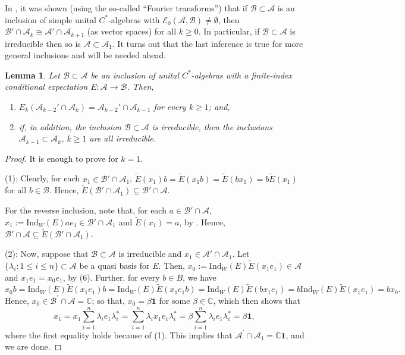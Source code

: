 \documentclass{amsart}
\numberwithin{equation}{section}
\newcommand{\Ind}{\mathrm{Ind}}
\newcommand{\mbb}{\mathbb}
\newcommand{\C}{\mathbb C}
\newcommand{\1}{\mathbf{1}}
\newcommand{\mA}{\mathcal{A}}
\newcommand{\mB}{\mathcal{B}}
\newcommand{\mE}{\mathcal{E}}
\newtheorem{lemma}[theorem]{Lemma}
\begin{document}
In \cite[Proposition 3.2]{BG}, it was shown (using the so-called
``Fourier transforms'') that if $\mB \subset \mA$ is an inclusion of
simple unital $C^*$-algebras with $\mE_0(\mA, \mB) \neq \emptyset$,
then $\mB'\cap \mA_{k} \cong \mA'\cap \mA_{k+1}$ (as vector spaces)
for all $k \geq 0$. In particular, if $\mB \subset \mA$ is irreducible
then so is $\mA \subset \mA_1$. It turns out that the last inference
is true for more general inclusions and will be needed ahead.

\begin{lemma}\label{irreducible-tower}
Let $\mB \subset \mA$ be an  inclusion of unital
$C^*$-algebras with a finite-index conditional expectation $E: \mA \to
\mB$. Then, 
\begin{enumerate}
\item $ E_{k}(\mA_{k-2}'\cap \mA_{k})= \mA_{k-2}' \cap \mA_{k-1}  $ for
  every $k \geq 1$; and,
  \item if, in addition, the inclusion $\mB \subset \mA$ is
    irreducible, then the inclusions $\mA_{k-1}\subset \mA_{k}$, $k
    \geq 1$ are all irreducible.
\end{enumerate}
\end{lemma}
\begin{proof} It is enough to prove for $k =1$. 

  (1):  Clearly, for  each $x_1\in \mB'\cap \mA_1$, 
  \(
  \widetilde{E}(x_1) b = \widetilde{E}(x_1b) =
  \widetilde{E}(bx_1) = b \widetilde{E}(x_1)
  \) for all $b \in \mB$.   Hence,
  $ \widetilde{E}(\mB'\cap \mA_1) \subseteq \mB'\cap \mA$.

  For the reverse inclusion, note that,  for each $a \in \mB'\cap \mA$,
  $x_1:=\Ind_W(E) ae_1 \in \mB'\cap \mA_1$ and
  $\widetilde{E}(x_1) = a$, by . Hence, $\mB'\cap \mA
  \subseteq \widetilde{E}(\mB'\cap \mA_1)$.\smallskip

  (2): Now, suppose that $\mB \subset \mA$ is irreducible and $x_1 \in
  \mA'\cap \mA_1$. Let $\{\lambda_i: 1 \leq i \leq n\} \subset \mA$ be
  a quasi basis for $E$. Then, $x_0 := \Ind_W(E) \widetilde{E}(x_1
  e_1)\in \mA$ and $x_1e_1= x_{0}e_1$, by (6). Further, for every $b\in B$, we have
\[
x_{0}b = \Ind_W(E)\widetilde{E}(x_1e_1)b= \Ind_W(E)\widetilde{E}(x_1e_1b)=
\Ind_W(E) \widetilde{E}(bx_1e_1)= b \Ind_W(E)\widetilde{E}(x_1e_1)= bx_0.
\]
Hence, $x_0\in \mB^{'}\cap \mA =\C$; so that, $x_0= \beta\1$ for some $\beta\in \mbb{C}$, which then shows that 
\[
x_1  =  x_1\sum_{i=1}^n \lambda_{i}e_1\lambda_{i}^* 
 =  \sum_{i=1}^n \lambda_{i}x_1e_1\lambda_{i}^*
 =   \beta\sum_{i=1}^n \lambda_{i} e_1\lambda_{i}^*
 =  \beta \1,
 \]
where the first equality holds because of (1).
 This implies that $\mA^{'}\cap \mA_1 =  \mbb{C}\1$, and we are done.
 \end{proof}
\end{document}
